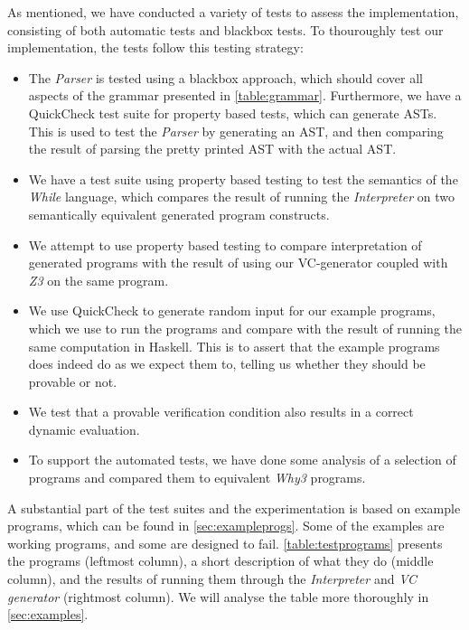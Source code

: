 
As mentioned, we have conducted a variety of tests to assess the implementation, consisting of both automatic tests and blackbox tests.
To thouroughly test our implementation, the tests follow this testing strategy:
\begin{itemize}
	\item The \textit{Parser} is tested using a blackbox approach, which should cover all aspects of the grammar presented in \cref{table:grammar}.
  Furthermore, we have a QuickCheck test suite for property based tests, which can generate ASTs. This is used to test the \textit{Parser} by generating an AST, and then comparing the result of parsing the pretty printed AST with the actual AST.
	\item We have a test suite using property based testing to test the semantics of the \textit{While} language, which compares the result of running the \textit{Interpreter} on two semantically equivalent generated program constructs.
	\item We attempt to use property based testing to compare interpretation of generated programs with the result of using our VC-generator coupled with \textit{Z3} on the same program.
  \item We use QuickCheck to generate random input for our example programs, which we use to run the programs and compare with the result of running the same computation in Haskell. This is to assert that the example programs does indeed do as we expect them to, telling us whether they should be provable or not.
	\item We test that a provable verification condition also results in a correct dynamic evaluation.
  \item To support the automated tests, we have done some analysis of a selection of programs and compared them to equivalent \textit{Why3} programs.
\end{itemize}

A substantial part of the test suites and the experimentation is based on example programs, which can be found in \cref{sec:exampleprogs}.
Some of the examples are working programs, and some are designed to fail.
\cref{table:testprograms} presents the programs (leftmost column), a short description of what they do (middle column), and the results of running them through the \textit{Interpreter} and \textit{VC generator} (rightmost column).
We will analyse the table more thoroughly in \cref{sec:examples}.

